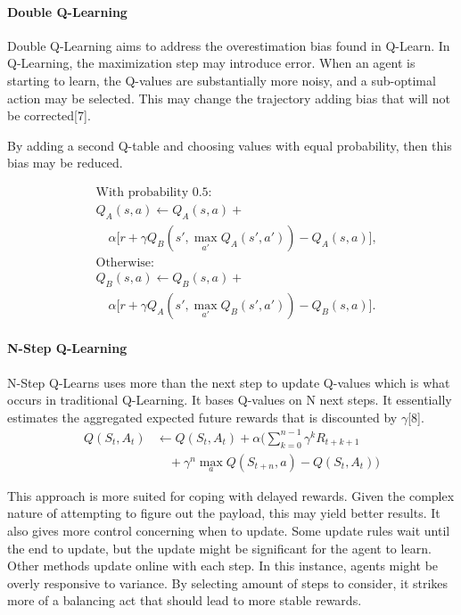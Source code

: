 \documentclass[conference]{IEEEtran}
\begin{document}
\paragraph{Double Q-Learning}
Double Q-Learning aims to address the overestimation bias found in Q-Learn. In Q-Learning, the maximization step may introduce error. When an agent is starting to learn, the Q-values are substantially more noisy, and a sub-optimal action may be selected. This may change the trajectory adding bias that will not be corrected[7]. 

By adding a second Q-table and choosing values with equal probability, then this bias may be reduced.

\begin{equation}
\begin{split}
    &\text{With probability 0.5:} \\
    &Q_A(s, a) \leftarrow Q_A(s, a) + \\
    &\quad \alpha \big[ r + \gamma Q_B\left(s', \max_{a'} Q_A(s', a')\right) - Q_A(s, a) \big], \\
    &\text{Otherwise:} \\
    &Q_B(s, a) \leftarrow Q_B(s, a) + \\
    &\quad \alpha \big[ r + \gamma Q_A\left(s', \max_{a'} Q_B(s', a')\right) - Q_B(s, a) \big].
\end{split}
\end{equation}

\paragraph{N-Step Q-Learning}
N-Step Q-Learns uses more than the next step to update Q-values which is what occurs in traditional Q-Learning. It bases Q-values on N next steps. It essentially estimates the aggregated expected future rewards that is discounted by $\gamma$[8].  
\begin{equation}
\begin{aligned}
Q(S_t, A_t) & \leftarrow Q(S_t, A_t) + \alpha \Bigg( \sum_{k=0}^{n-1} \gamma^k R_{t+k+1} \\
            & \quad + \gamma^n \max_a Q(S_{t+n}, a) - Q(S_t, A_t) \Bigg)
\end{aligned}
\end{equation}

This approach is more suited for coping with delayed rewards. Given the complex nature of attempting to figure out the payload, this may yield better results. It also gives more control concerning when to update. Some update rules wait until the end to update, but the update might be significant for the agent to learn. Other methods update online with each step. In this instance, agents might be overly responsive to variance. By selecting amount of steps to consider, it strikes more of a balancing act that should lead to more stable rewards.  
\end{document}
